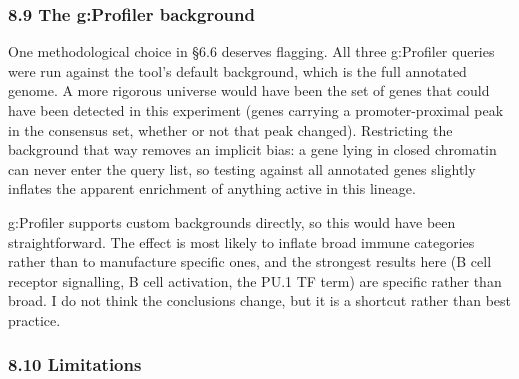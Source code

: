 \documentclass[
  11pt,
  a4paper,
]{article}
\begin{document}
\hypertarget{the-gprofiler-background}{%
\subsubsection{8.9 The g:Profiler
background}\label{the-gprofiler-background}}

One methodological choice in §6.6 deserves flagging. All three
g:Profiler queries were run against the tool's default background, which
is the full annotated genome. A more rigorous universe would have been
the set of genes that could have been detected in this experiment (genes
carrying a promoter-proximal peak in the consensus set, whether or not
that peak changed). Restricting the background that way removes an
implicit bias: a gene lying in closed chromatin can never enter the
query list, so testing against all annotated genes slightly inflates the
apparent enrichment of anything active in this lineage.

g:Profiler supports custom backgrounds directly, so this would have been
straightforward. The effect is most likely to inflate broad immune
categories rather than to manufacture specific ones, and the strongest
results here (B cell receptor signalling, B cell activation, the PU.1 TF
term) are specific rather than broad. I do not think the conclusions
change, but it is a shortcut rather than best practice.

\hypertarget{limitations}{%
\subsubsection{8.10 Limitations}\label{limitations}}
\end{document}
